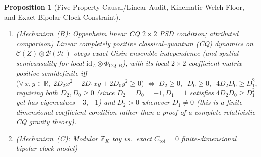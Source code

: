\documentclass[11pt,a4paper]{article}
\newtheorem{proposition}{Proposition}
\theoremstyle{definition}
\theoremstyle{remark}
\newcommand{\id}{\mathrm{id}}
\newcommand{\RMS}{\operatorname{RMS}}
\newcommand{\cH}{\mathcal{H}}
\newcommand{\cB}{\mathcal{B}}
\newcommand{\cC}{\mathcal{C}}
\newcommand{\bbR}{\mathbb{R}}
\newcommand{\bbZ}{\mathbb{Z}}
\newcommand{\1}{\mathbf{1}}
\begin{document}
\begin{proposition}[Five-Property Causal/Linear Audit, Kinematic Welch Floor, and Exact Bipolar-Clock Constraint]
\begin{enumerate}
\begin{itemize}
    which is strictly positive whenever $M>r\ge 1$. For $M\le r$, isometric embeddings ($G_{xy}=\delta_{xy}$) exist (though non-isometric $V$ remain possible); for $M>r$, the \emph{right-hand side} approaches $r^{-1/2}=d_{\mathrm{BH}}^{-1/2}$ ($=e^{-S_{\mathrm{BH}}/2}$ upon identifying $d_{\mathrm{BH}}=e^{S_{\mathrm{BH}}}$) as $M\gg r$, with typical $\Theta(r^{-1/2})$ overlaps observed on column-normalized Haar projections (note that column-normalizing the top $r$ rows of a Haar unitary generally breaks exact tightness $VV^\dagger=\frac{M}{r}\1_r$, producing RMS strictly above the Welch bound). However, \eqref{eq:welch-floor} is strictly a lower bound and implies no universal $O(r^{-1/2})$ upper bound: placing $M-r+1$ copies of $e_1$ together with $e_2,\dots,e_r$ produces a \emph{full-row-rank} ($=r$) unit-column matrix with $\RMS^2=\frac{(M-r+1)(M-r)}{M(M-1)}\to 1$ as $M=r^2\to\infty$ (e.g.\ at $r=8,M=64$, $\RMS=0.88976 \gg \mathrm{Welch}=1/3$). Moreover, $M/r$ is a dimension ratio with no local curvature invariant or time unit defined here, and \eqref{eq:welch-floor} constrains kinematic state distinguishability rather than defining a dynamical inter-branch transition rate.
  \end{itemize}
  \item[(B)] \emph{(Mechanism~(B): Oppenheim linear CQ $2\times 2$ PSD condition; attributed comparison)} Linear completely positive classical--quantum (CQ) dynamics on $\cC(Z)\otimes\cB(\cH)$ \cite{Oppenheim2023PRX,Oppenheim2023NatComm} obeys exact Gisin ensemble independence (and spatial semicausality for local $\id_A\otimes\Phi_{\mathrm{CQ},B}$), with its local $2\times 2$ coefficient matrix positive semidefinite iff
  \begin{equation}\label{eq:cq-psd}
    \bigl(\forall\,x,y\in\bbR,\; 2D_2 x^2 + 2D_1 x y + 2D_0 y^2 \ge 0\bigr)
    \;\Longleftrightarrow\;
    D_2\ge 0,\;\; D_0\ge 0,\;\; 4 D_2 D_0 \ge D_1^2,
  \end{equation}
  requiring both $D_2,D_0\ge 0$ (since $D_2=D_0=-1,D_1=1$ satisfies $4D_2 D_0\ge D_1^2$ yet has eigenvalues $-3,-1$) and $D_2>0$ whenever $D_1\neq 0$ (this is a finite-dimensional coefficient condition rather than a proof of a complete relativistic CQ gravity theory).
  \item[(C)] \emph{(Mechanism~(C): Modular $\bbZ_K$ toy vs.\ exact $C_{\mathrm{tot}}=0$ finite-dimensional bipolar-clock model)}
  \begin{enumerate}

\end{enumerate}
\end{enumerate}
\end{proposition}
\end{document}

